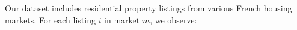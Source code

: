 Our dataset includes residential property listings from various French housing markets. For each listing $i$ in market $m$, we observe:
